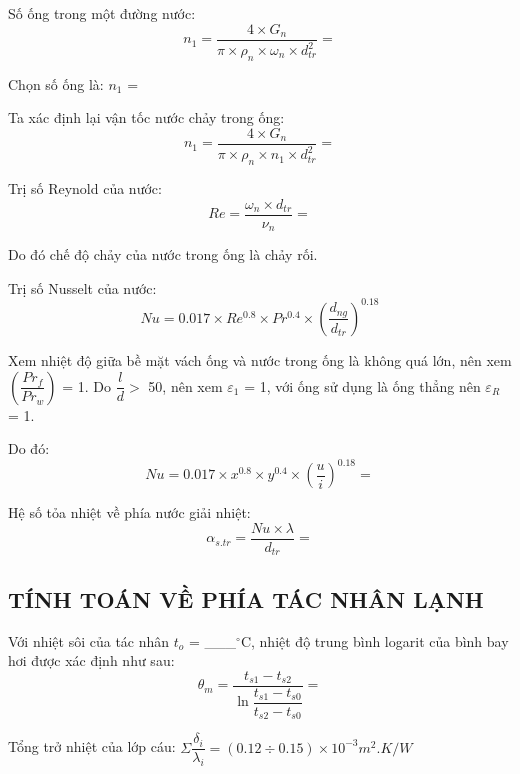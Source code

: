 Số ống trong một đường nước:
\begin{equation*}
	n_{1} = \dfrac{4\times G_{n}}{\pi\times\rho_{n}\times\omega_{n}\times d_{tr}^2} = 
\end{equation*}

Chọn số ống là: $n_{1}$  = 

Ta xác định lại vận tốc nước chảy trong ống:
\begin{equation*}
	n_{1} = \dfrac{4\times G_{n}}{\pi\times\rho_{n}\times n_{1}\times d_{tr}^2} = 
\end{equation*}

Trị số Reynold của nước:
\begin{equation*}
	Re = \dfrac{\omega_{n}\times d_{tr}}{\nu_{n}} =
\end{equation*}

Do đó chế độ chảy của nước trong ống là chảy rối.

Trị số Nusselt của nước:
\begin{equation*}
	Nu = 0.017\times Re^{0.8}\times Pr^{0.4}\times\left(\dfrac{d_{ng}}{d_{tr}}\right)^{0.18}
\end{equation*}

Xem nhiệt độ giữa bề mặt vách ống và nước trong ống là không quá lớn, nên xem $\left(\dfrac{Pr_{f}}{Pr_{w}}\right)$ = 1. Do $\dfrac{l}{d} >$ 50, nên xem $\varepsilon_{1}$ = 1, với ống sử dụng là ống thẳng nên $\varepsilon_{R}$ = 1.

Do đó:
\begin{equation*}
	Nu = 0.017\times x^{0.8}\times y^{0.4}\times\left(\dfrac{u}{i}\right)^{0.18} = 
\end{equation*}

Hệ số tỏa nhiệt về phía nước giải nhiệt:
\begin{equation*}
	\alpha_{s.tr} = \dfrac{Nu\times\lambda}{d_{tr}} =
\end{equation*}

\subsection{TÍNH TOÁN VỀ PHÍA TÁC NHÂN LẠNH}
Với nhiệt sôi của tác nhân $t_{o}$ = \_\_\_$^{\circ}$C, nhiệt độ trung bình logarit của bình bay hơi được xác định như sau:
\begin{equation*}
	\theta_{m} = \dfrac{t_{s1} - t_{s2}}{\ln{\dfrac{t_{s1} - t_{s0}}{t_{s2} - t_{s0}}}} = 
\end{equation*}

Tổng trở nhiệt của lớp cáu:
$\Sigma \dfrac{\delta_{i}}{\lambda_{i}} = (0.12 \div 0.15)\times 10^{-3} m^2.K/W$

